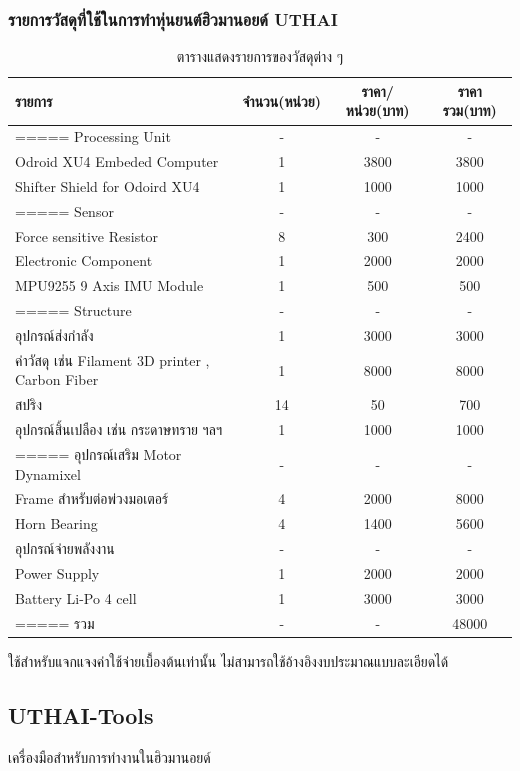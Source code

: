 \subsubsection{รายการวัสดุที่ใช้ในการทำหุ่นยนต์ฮิวมานอยด์ UTHAI}
\begin{table}[ht]
	\centering
	\begin{tabular}{| l | c | c | c|}
		\hline
		รายการ & จำนวน(หน่วย) & ราคา/หน่วย(บาท) & ราคารวม(บาท) \\
		\hline
		===== Processing Unit & - & - & -\\
		Odroid XU4 Embeded Computer & 1 & 3800 & 3800\\
		Shifter Shield for Odoird XU4 & 1 & 1000 & 1000\\
		===== Sensor & - & - & -\\
		Force sensitive Resistor & 8 & 300 & 2400\\
		Electronic Component & 1 & 2000 & 2000\\
		MPU9255 9 Axis IMU Module & 1 & 500 & 500\\
		===== Structure & - & - & -\\
		อุปกรณ์ส่งกำลัง & 1 & 3000 & 3000\\
		ค่าวัสดุ เช่น Filament 3D printer , Carbon Fiber & 1 & 8000 & 8000\\
		สปริง & 14 & 50 & 700\\
		อุปกรณ์สิ้นเปลือง เช่น กระดาษทราย ฯลฯ & 1 & 1000 & 1000\\
		===== อุปกรณ์เสริม Motor Dynamixel & - & - & -\\
		Frame สำหรับต่อพ่วงมอเตอร์ & 4 & 2000 & 8000\\
		Horn Bearing & 4 & 1400 & 5600\\
		อุปกรณ์จ่ายพลังงาน & - & - & -\\
		Power Supply & 1 & 2000 & 2000\\
		Battery Li-Po 4 cell & 1 & 3000 & 3000\\
		===== รวม & - & - & 48000\\
		\hline
	\end{tabular}
	\caption{ตารางแสดงรายการของวัสดุต่าง ๆ}
	\label{tab:matrial_buyer}
\end{table}
ใช้สำหรับแจกแจงค่าใช้จ่ายเบื้องต้นเท่านั้น ไม่สามารถใช้อ้างอิงงบประมาณแบบละเอียดได้

\clearpage
\subsection*{UTHAI-Tools}
เครื่องมือสำหรับการทำงานในฮิวมานอยด์

